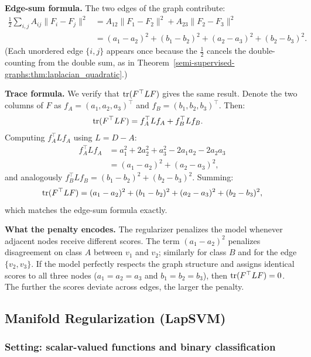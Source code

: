 \begin{notechapter}
\begin{example}
\textbf{Edge-sum formula.} The two edges of the graph contribute:
\begin{align*}
\frac{1}{2}\sum_{i,j}A_{ij}\|F_i - F_j\|^2
&= A_{12}\|F_1 - F_2\|^2 + A_{23}\|F_2 - F_3\|^2 \\
&= (a_1 - a_2)^2 + (b_1 - b_2)^2
 + (a_2 - a_3)^2 + (b_2 - b_3)^2.
\end{align*}
(Each unordered edge $\{i,j\}$ appears once because the $\frac{1}{2}$ cancels
the double-counting from the double sum, as in Theorem~\ref{semi-supervised-graphs:thm:laplacian_quadratic}.)

\textbf{Trace formula.} We verify that $\operatorname{tr}(F^\top LF)$ gives the same result.
Denote the two columns of $F$ as $f_A = (a_1, a_2, a_3)^\top$ and
$f_B = (b_1, b_2, b_3)^\top$. Then:
\begin{align*}
\operatorname{tr}(F^\top LF) &= f_A^\top L f_A + f_B^\top L f_B.
\end{align*}
Computing $f_A^\top L f_A$ using $L = D - A$:
\begin{align*}
f_A^\top L f_A
&= a_1^2 + 2a_2^2 + a_3^2 - 2a_1 a_2 - 2a_2 a_3 \\
&= (a_1 - a_2)^2 + (a_2 - a_3)^2,
\end{align*}
and analogously $f_B^\top L f_B = (b_1 - b_2)^2 + (b_2 - b_3)^2$. Summing:
\[
\operatorname{tr}(F^\top LF) = (a_1-a_2)^2 + (b_1-b_2)^2 + (a_2-a_3)^2 + (b_2-b_3)^2,
\]
which matches the edge-sum formula exactly.

\textbf{What the penalty encodes.} The regularizer penalizes the model
whenever adjacent nodes receive different scores. The term $(a_1 - a_2)^2$
penalizes disagreement on class $A$ between $v_1$ and $v_2$; similarly for
class $B$ and for the edge $\{v_2, v_3\}$. If the model perfectly respects
the graph structure and assigns identical scores to all three nodes
($a_1 = a_2 = a_3$ and $b_1 = b_2 = b_3$), then $\operatorname{tr}(F^\top LF) = 0$.
The further the scores deviate across edges, the larger the penalty.
\end{example}

\subsection{Manifold Regularization (LapSVM)}
\label{semi-supervised-graphs:subsec:manifold_reg}

\subsubsection*{Setting: scalar-valued functions and binary classification}


\end{notechapter}
